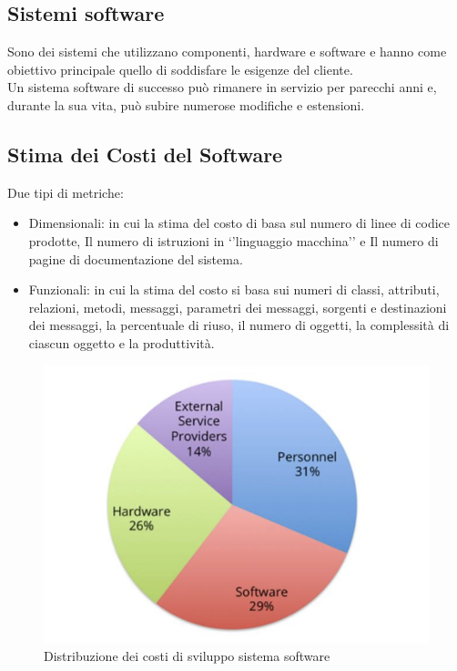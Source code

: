\documentclass{article}
\begin{document}
	\subsection{Sistemi software}
	Sono dei sistemi che utilizzano componenti, hardware e software e hanno come obiettivo principale quello di soddisfare le esigenze del cliente.\\
	Un sistema software di successo può rimanere in servizio per
	parecchi anni e, durante la sua vita, può subire numerose modifiche e
	estensioni.
	\subsection{Stima dei Costi del Software}
	Due tipi di metriche:
	\begin{itemize}
		\item Dimensionali: in cui la stima del costo di basa sul numero
		di linee di codice prodotte, Il numero di istruzioni in ‘’linguaggio macchina’’
		e Il numero di pagine di documentazione del sistema.
		\item Funzionali: in cui la stima del costo si basa sui numeri di
		classi, attributi, relazioni, metodi, messaggi, parametri dei messaggi,
		sorgenti e destinazioni dei messaggi, la percentuale di riuso, il numero
		di oggetti, la complessità di ciascun oggetto e la produttività.
	\end{itemize}
	\begin{figure}[h]
		\centering
		\includegraphics[scale=0.8]{1.dist_costi.png}
		\caption{Distribuzione dei costi di sviluppo sistema software}
	\end{figure}
\end{document}
